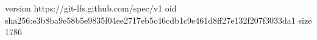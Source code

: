 version https://git-lfs.github.com/spec/v1
oid sha256:e3b8ba9e58b5e9835f04ee2717eb5c46cdb1c9e461d8ff27e132f207f3033da1
size 1786
